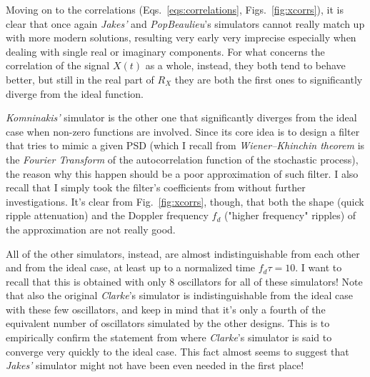 Moving on to the correlations (Eqs.~\ref{eqs:correlations}, Figs.~\ref{fig:xcorrs}), it is clear that once again \textit{Jakes'} and \textit{PopBeaulieu}'s simulators cannot really match up with more modern solutions, resulting very early very imprecise especially when dealing with single real or imaginary components. For what concerns the correlation of the signal $X(t)$ as a whole, instead, they both tend to behave better, but still in the real part of $R_X$ they are both the first ones to significantly diverge from the ideal function.

\textit{Komninakis'} simulator is the other one that significantly diverges from the ideal case when non-zero functions are involved. Since its core idea is to design a filter that tries to mimic a given PSD (which I recall from \textit{Wiener–Khinchin theorem} is the \textit{Fourier Transform} of the autocorrelation function of the stochastic process), the reason why this happen should be a poor approximation of such filter. I also recall that I simply took the filter's coefficients from \cite{digital} without further investigations. It's clear from Fig.~\ref{fig:xcorrs}, though, that both the shape (quick ripple attenuation) and the Doppler frequency $f_d$ ("higher frequency" ripples) of the approximation are not really good.

All of the other simulators, instead, are almost indistinguishable from each other and from the ideal case, at least up to a normalized time $f_d\tau = 10$. I want to recall that this is obtained with only $8$ oscillators for all of these simulators! Note that also the original \textit{Clarke}'s simulator is indistinguishable from the ideal case with these few oscillators, and keep in mind that it's only a fourth of the equivalent number of oscillators simulated by the other designs. This is to empirically confirm the statement from \cite{B1} where \textit{Clarke}'s simulator is said to converge very quickly to the ideal case. This fact almost seems to suggest that \textit{Jakes'} simulator might not have been even needed in the first place!


